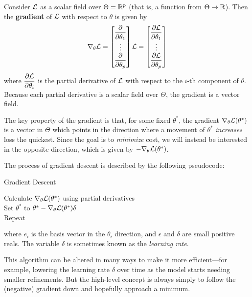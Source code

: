 \documentclass[12pt,twoside]{reedthesis}
\begin{document}
\begin{definition}
Consider $\mathcal{L}$ as a scalar field over $\Theta = \R^p$ (that is, a function from $\Theta \to \R$). Then the \textbf{gradient} of $\mathcal{L}$ with respect to $\theta$ is given by
\begin{equation*}
    \nabla_\theta \mathcal{L} = \begin{bmatrix}\dfrac{\partial{}}{\partial{\theta_1}}\\ \vdots \\\dfrac{\partial{}}{\partial{\theta_p}}\end{bmatrix} \mathcal{L} = \begin{bmatrix}\dfrac{\partial{\mathcal{L}}}{\partial{\theta_1}}\\ \vdots \\\dfrac{\partial{\mathcal{L}}}{\partial{\theta_p}}\end{bmatrix}
\end{equation*}
where $\dfrac{\partial{\mathcal{L}}}{\partial{\theta_i}}$ is the partial derivative of $\mathcal{L}$ with respect to the $i$-th component of $\theta$. Because each partial derivative is a scalar field over $\Theta$, the gradient is a vector field.
\end{definition}

The key property of the gradient is that, for some fixed $\theta^*$, the gradient $\nabla_\theta \mathcal{L}(\theta^*)$ is a vector in $\Theta$ which points in the direction where a movement of $\theta^*$ \textit{increases} loss the quickest. Since the goal is to \textit{minimize} cost, we will instead be interested in the opposite direction, which is given by $-\nabla_\theta \mathcal{L}(\theta^*)$.

The process of gradient descent is described by the following pseudocode:

\begin{algorithm}[H]
    \caption{Gradient Descent}
    Calculate $\nabla_\theta \mathcal{L}(\theta^*)$ using partial derivatives\\
    Set $\theta^*$ to $\theta^* - \nabla_\theta\mathcal{L}(\theta^*)\delta$\\
    Repeat
\end{algorithm}
where $e_i$ is the basis vector in the $\theta_i$ direction, and $\epsilon$ and $\delta$ are small positive reals. The variable $\delta$ is sometimes known as the \textit{learning rate}.

This algorithm can be altered in many ways to make it more efficient—for example, lowering the learning rate $\delta$ over time as the model starts needing smaller refinements. But the high-level concept is always simply to follow the (negative) gradient down and hopefully approach a minimum.
\end{document}
